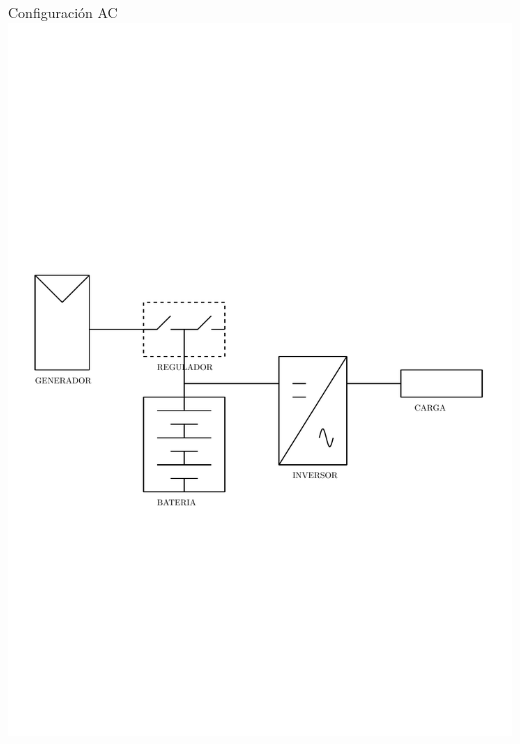 \documentclass[xcolor={usenames,svgnames,dvipsnames}]{beamer}
\begin{document}
\begin{frame}[label=sec-1-0-3]{Configuración AC}
\includegraphics[width=.9\linewidth]{../figs/DiagramaUnifilarER_AC.pdf}
\end{frame}
\end{document}
